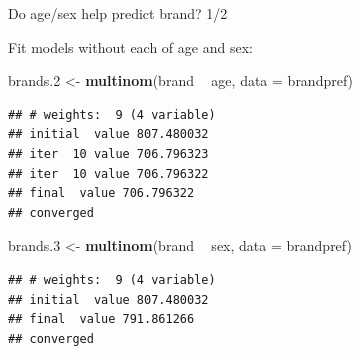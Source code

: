 \documentclass[
  ignorenonframetext,
]{beamer}
\newenvironment{Shaded}{\begin{snugshade}}{\end{snugshade}}
\newcommand{\DataTypeTok}[1]{\textcolor[rgb]{0.13,0.29,0.53}{#1}}
\newcommand{\FloatTok}[1]{\textcolor[rgb]{0.00,0.00,0.81}{#1}}
\newcommand{\KeywordTok}[1]{\textcolor[rgb]{0.13,0.29,0.53}{\textbf{#1}}}
\newcommand{\NormalTok}[1]{#1}
\newcommand{\OperatorTok}[1]{\textcolor[rgb]{0.81,0.36,0.00}{\textbf{#1}}}
\newcommand{\StringTok}[1]{\textcolor[rgb]{0.31,0.60,0.02}{#1}}
\begin{document}
\begin{frame}[fragile]{Do age/sex help predict brand? 1/2}
\protect\hypertarget{do-agesex-help-predict-brand-12}{}

Fit models without each of age and sex:

\begin{Shaded}
\begin{Highlighting}[]
\NormalTok{brands}\FloatTok{.2}\NormalTok{ <-}\StringTok{ }\KeywordTok{multinom}\NormalTok{(brand }\OperatorTok{~}\StringTok{ }\NormalTok{age, }\DataTypeTok{data =}\NormalTok{ brandpref)}
\end{Highlighting}
\end{Shaded}

\begin{verbatim}
## # weights:  9 (4 variable)
## initial  value 807.480032 
## iter  10 value 706.796323
## iter  10 value 706.796322
## final  value 706.796322 
## converged
\end{verbatim}

\begin{Shaded}
\begin{Highlighting}[]
\NormalTok{brands}\FloatTok{.3}\NormalTok{ <-}\StringTok{ }\KeywordTok{multinom}\NormalTok{(brand }\OperatorTok{~}\StringTok{ }\NormalTok{sex, }\DataTypeTok{data =}\NormalTok{ brandpref)}
\end{Highlighting}
\end{Shaded}

\begin{verbatim}
## # weights:  9 (4 variable)
## initial  value 807.480032 
## final  value 791.861266 
## converged
\end{verbatim}

\end{frame}
\end{document}
